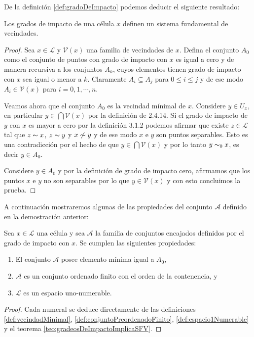 De la definición \ref{def:gradoDeImpacto} podemos deducir el siguiente resultado:

\begin{teorema}\label{teo:gradeosDeImpactoImplicaSFV}
Los grados de impacto de una célula $x$ definen un sistema fundamental de vecindades.
\end{teorema}
\begin{proof}
Sea $x\in\mathcal{L}$ y $\mathcal{V}(x)$ una familia de vecindades de $x$. Defina el conjunto $A_0$ como el conjunto de puntos con grado de impacto con $x$ es igual a cero y de manera recursiva a los conjuntos $A_k$, cuyos elementos tienen grado de impacto con $x$ sea igual o menor a $k$. Claramente $A_i\subseteq A_j$ para $0\leq i\leq j$ y de ese modo $A_i\in\mathcal{V}(x)$ para $i=0,1,\cdots,n$.

Veamos ahora que el conjunto $A_0$ es la vecindad mínimal de $x$. Considere $y\in U_x$, en particular $y\in\bigcap\mathcal{V}(x)$ por la definición de 2.4.14. Si el grado de impacto de $y$ con $x$ es mayor a cero por la definición 3.1.2 podemos afirmar que existe $z\in\mathcal{L}$ tal que $z\thicksim x$, $z\thicksim y$ y $x\not\thicksim y$ y de ese modo $x$ e $y$ son puntos separables. Esto es una contradicción por el hecho de que $y\in \bigcap \mathcal{V}(x)$ y por lo tanto $y\thicksim_0 x$, es decir $y\in A_0$.

Considere $y\in A_0$ y por la definición de grado de impacto cero, afirmamos que los puntos $x$ e $y$ no son separables por lo que $y\in\mathcal{V}(x)$ y con esto concluimos la prueba.
\end{proof}

A continuación mostraremos algunas de las propiedades del conjunto $\mathcal{A}$ definido en la demostración anterior:

\begin{proposicion}\label{pro:propiedadesSistemasDeVecindadesEncajadas}
Sea $x\in\mathcal{L}$ una célula y sea $\mathcal{A}$ la familia de conjuntos encajados definidos por el grado de impacto con $x$. Se cumplen las siguientes propiedades:
\begin{enumerate}
    \item El conjunto $\mathcal{A}$ posee elemento mínima igual a $A_0$,
    \item $\mathcal{A}$ es un conjunto ordenado finito con el orden de la contenencia, y
    \item $\mathcal{L}$ es un espacio uno-numerable.
\end{enumerate}
\end{proposicion}
\begin{proof}
Cada numeral se deduce directamente de las definiciones \ref{def:vecindadMinimal}, \ref{def:conjuntoPreordenadoFinito}, \ref{def:espacio1Numerable} y el teorema \ref{teo:gradeosDeImpactoImplicaSFV}.
\end{proof}

